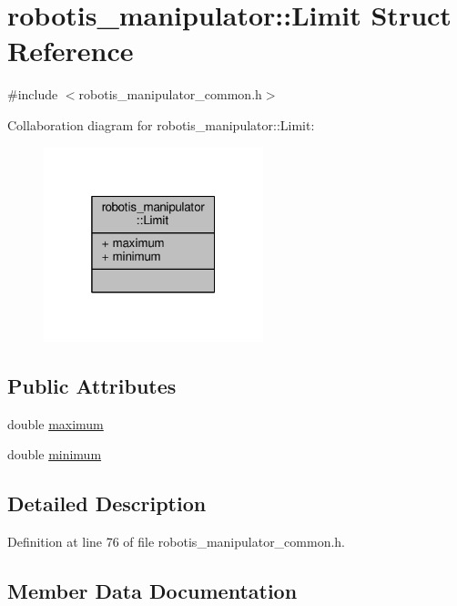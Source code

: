 \hypertarget{structrobotis__manipulator_1_1_limit}{}\section{robotis\+\_\+manipulator\+:\+:Limit Struct Reference}
\label{structrobotis__manipulator_1_1_limit}


{\ttfamily \#include $<$robotis\+\_\+manipulator\+\_\+common.\+h$>$}



Collaboration diagram for robotis\+\_\+manipulator\+:\+:Limit\+:\nopagebreak
\begin{figure}[H]
\begin{center}
\leavevmode
\includegraphics[width=181pt]{structrobotis__manipulator_1_1_limit__coll__graph}
\end{center}
\end{figure}
\subsection*{Public Attributes}
\begin{DoxyCompactItemize}
\item 
double \hyperlink{structrobotis__manipulator_1_1_limit_a82c3d92bd685eb0484fc3ae47f2c3744}{maximum}
\item 
double \hyperlink{structrobotis__manipulator_1_1_limit_ac32cfcc9a4d06728b518e294a0a6030e}{minimum}
\end{DoxyCompactItemize}


\subsection{Detailed Description}


Definition at line 76 of file robotis\+\_\+manipulator\+\_\+common.\+h.



\subsection{Member Data Documentation}
